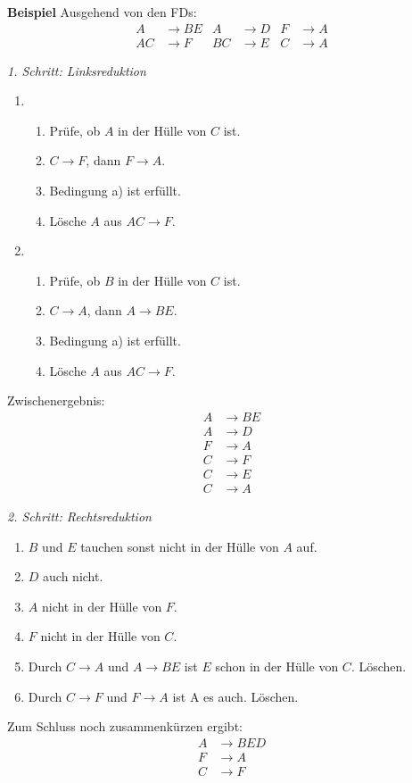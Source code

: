 \documentclass[a4paper,parskip=half*,DIV=15,fontsize=11pt]{scrartcl}
\begin{document}
\textbf{Beispiel} Ausgehend von den FDs:
\begin{align*}
A &\to BE & A &\to D & F &\to A \\ AC &\to F & BC &\to E & C &\to A
\end{align*}
\begin{minipage}[t]{0.49\textwidth}
\emph{1. Schritt: Linksreduktion}
\begin{enumerate}
\item
\begin{enumerate}
\item Prüfe, ob $A$ in der Hülle von $C$ ist.
\item $C \to F$, dann $F \to A$.
\item Bedingung a) ist erfüllt.
\item Lösche $A$ aus $AC \to F$.
\end{enumerate}
\item
\begin{enumerate}
\item Prüfe, ob $B$ in der Hülle von $C$ ist.
\item $C \to A$, dann $A \to BE$.
\item Bedingung a) ist erfüllt.
\item Lösche $A$ aus $AC \to F$.
\end{enumerate}
\end{enumerate}
Zwischenergebnis:
\begin{align*}
A &\to BE \\ A &\to D \\ F &\to A \\ C &\to F \\ C &\to E \\ C &\to A
\end{align*}
\end{minipage}
\hspace{0.02\textwidth}
\begin{minipage}[t]{0.49\textwidth}
\emph{2. Schritt: Rechtsreduktion}
\begin{enumerate}\itemsep0em
\item $B$ und $E$ tauchen sonst nicht in der Hülle von $A$ auf.
\item $D$ auch nicht.
\item $A$ nicht in der Hülle von $F$.
\item $F$ nicht in der Hülle von $C$.
\item Durch $C \to A$ und $A \to BE$ ist $E$ schon in der Hülle von $C$. Löschen.
\item Durch $C \to F$ und $F \to A$ ist A es auch. Löschen.
\end{enumerate}
Zum Schluss noch zusammenkürzen ergibt:
\begin{align*}
A &\to BED \\F &\to A \\ C &\to F
\end{align*}
\end{minipage}
\end{document}
